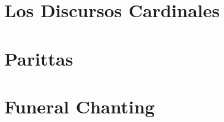\suttasPartSettings


\part{Los Discursos Cardinales}

\suttasChapterSettings



\suttasSettingsRestore

%
\part{Parittas}

%

%
%
%
\part{Funeral Chanting}
%
%

%

